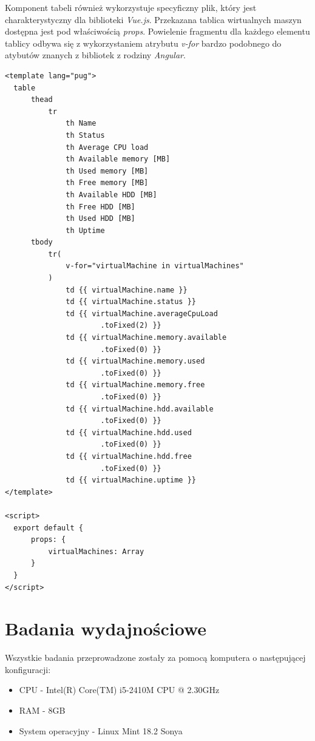 \documentclass[polish, twoside, 12pt]{mwart}
\let\stdsection\section
\renewcommand*{\section}{\clearpage\stdsection}
\begin{document}
Komponent tabeli również wykorzystuje specyficzny plik, który jest charakterystyczny dla biblioteki \emph{Vue.js}. Przekazana tablica wirtualnych maszyn dostępna jest pod właściwością \emph{props}. Powielenie fragmentu dla każdego elementu tablicy odbywa się z wykorzystaniem atrybutu \emph{v-for} bardzo podobnego do atybutów znanych z bibliotek z rodziny \emph{Angular}.

\begin{lstlisting}[caption=Komponent tabeli]
<template lang="pug">
  table
      thead
          tr
              th Name
              th Status
              th Average CPU load
              th Available memory [MB]
              th Used memory [MB]
              th Free memory [MB]
              th Available HDD [MB]
              th Free HDD [MB]
              th Used HDD [MB]
              th Uptime
      tbody
          tr(
              v-for="virtualMachine in virtualMachines"
          )
              td {{ virtualMachine.name }}
              td {{ virtualMachine.status }}
              td {{ virtualMachine.averageCpuLoad
                      .toFixed(2) }}
              td {{ virtualMachine.memory.available
                      .toFixed(0) }}
              td {{ virtualMachine.memory.used
                      .toFixed(0) }}
              td {{ virtualMachine.memory.free
                      .toFixed(0) }}
              td {{ virtualMachine.hdd.available
                      .toFixed(0) }}
              td {{ virtualMachine.hdd.used
                      .toFixed(0) }}
              td {{ virtualMachine.hdd.free
                      .toFixed(0) }}
              td {{ virtualMachine.uptime }}
</template>

<script>
  export default {
      props: {
          virtualMachines: Array
      }
  }
</script>
\end{lstlisting}

\section{Badania wydajnościowe}

Wszystkie badania przeprowadzone zostały za pomocą komputera o następującej konfiguracji:

\begin{itemize}
  \item CPU - Intel(R) Core(TM) i5-2410M CPU @ 2.30GHz
  \item RAM - 8GB
  \item System operacyjny - Linux Mint 18.2 Sonya
\end{itemize}
\end{document}
